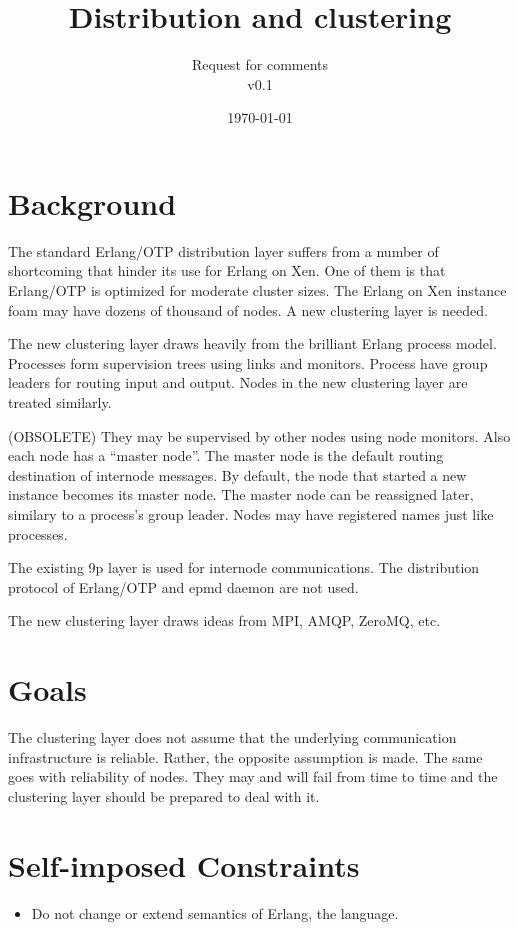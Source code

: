\documentclass{scrartcl}
\title{Distribution and clustering}
\subtitle{Request for comments\\v0.1}
\date{\today}
\begin{document}
\maketitle

\section*{Background}

The standard Erlang/OTP distribution layer suffers from a number of shortcoming
that hinder its use for Erlang on Xen. One of them is that Erlang/OTP is optimized
for moderate cluster sizes. The Erlang on Xen instance foam may have dozens of
thousand of nodes. A new clustering layer is needed.

The new clustering layer draws heavily from the brilliant Erlang process model.
Processes form supervision trees using links and monitors. Process have group
leaders for routing input and output. Nodes in the new clustering layer are
treated similarly.

(OBSOLETE) They may be supervised by other nodes using node monitors.
Also each node has a ``master node''. The master node is the default routing
destination of internode messages. By default, the node that started a new
instance becomes its master node. The master node can be reassigned later,
similary to a process's group leader. Nodes may have registered names just like
processes.

The existing 9p layer is used for internode communications. The distribution
protocol of Erlang/OTP and epmd daemon are not used.

The new clustering layer draws ideas from MPI, AMQP, ZeroMQ, etc.

\section*{Goals}

The clustering layer does not assume that the underlying communication
infrastructure is reliable. Rather, the opposite assumption is made. The same
goes with reliability of nodes. They may and will fail from time to time and the
clustering layer should be prepared to deal with it.

\section*{Self-imposed Constraints}

\begin{itemize}
\item Do not change or extend semantics of Erlang, the language.
\end{itemize}
\end{document}
